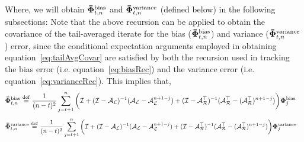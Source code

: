 Where, we will obtain $\boldsymbol{\bar{\Phi}}_{t,n}^{\text{bias}}$ and $\boldsymbol{\bar{\Phi}}_{t,n}^{\text{variance}}$ (defined below) in the following subsections: %
\fi
Note that the above recursion can be applied to obtain the covariance of the tail-averaged iterate for the bias ($\boldsymbol{\bar{\Phi}}_{t,n}^{\text{bias}}$) and variance ($\boldsymbol{\bar{\Phi}}_{t,n}^{\text{variance}}$) error, since the conditional expectation arguments employed in obtaining equation~\ref{eq:tailAvgCovar} are satisfied by both the recursion used in tracking the bias error (i.e. equation~\ref{eq:biasRec}) and the variance error (i.e. equation~\ref{eq:varianceRec}). This implies that,
\begin{align}
\label{eq:biasTailAvg1}
\boldsymbol{\bar{\Phi}}_{t,n}^{\text{bias}}&\stackrel{\mathrm{def}}{=}\frac{1}{(n-t)^2}\sum_{j=t+1}^n\bigg( \mathcal{I} + (\mathcal{I}-\mathcal{A}_{\mathcal{L}})^{-1}(\mathcal{A}_{\mathcal{L}}-\mathcal{A}_{\mathcal{L}}^{n+1-j}) + (\mathcal{I}-\mathcal{A}_{\mathcal{R}}^{\top})^{-1}(\mathcal{A}_{\mathcal{R}}^{\top}-(\mathcal{A}_{\mathcal{R}}^{\top})^{n+1-j}) \bigg)\boldsymbol{\Phi}_j^{\text{bias}}
\end{align}
\begin{align}
\label{eq:varianceTailAvg1}
\boldsymbol{\bar{\Phi}}_{t,n}^{\text{variance}}&\stackrel{\mathrm{def}}{=}\frac{1}{(n-t)^2}\sum_{j=t+1}^n\bigg( \mathcal{I} + (\mathcal{I}-\mathcal{A}_{\mathcal{L}})^{-1}(\mathcal{A}_{\mathcal{L}}-\mathcal{A}_{\mathcal{L}}^{n+1-j}) + (\mathcal{I}-\mathcal{A}_{\mathcal{R}}^{\top})^{-1}(\mathcal{A}_{\mathcal{R}}^{\top}-(\mathcal{A}_{\mathcal{R}}^{\top})^{n+1-j}) \bigg)\boldsymbol{\Phi}_j^{\text{variance}}
\end{align}
